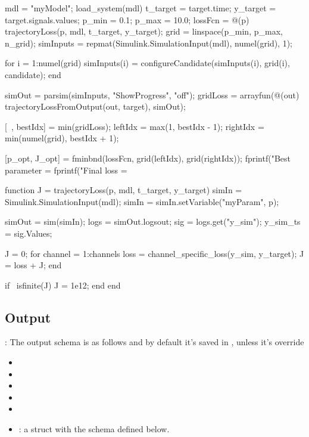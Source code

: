 \documentclass[11pt]{article}
\begin{document}
\begin{DocCode}
mdl = "myModel";
load_system(mdl)
t_target = target.time;
y_target = target.signals.values;
p_min = 0.1;
p_max = 10.0;
lossFcn = @(p) trajectoryLoss(p, mdl, t_target, y_target);
grid = linspace(p_min, p_max, n_grid);
simInputs = repmat(Simulink.SimulationInput(mdl), numel(grid), 1);

for i = 1:numel(grid)
    simInputs(i) = configureCandidate(simInputs(i), grid(i), candidate);
end

simOut = parsim(simInputs, "ShowProgress", "off");
gridLoss = arrayfun(@(out) trajectoryLossFromOutput(out, target), simOut);

[~, bestIdx] = min(gridLoss);
leftIdx = max(1, bestIdx - 1);
rightIdx = min(numel(grid), bestIdx + 1);

[p_opt, J_opt] = fminbnd(lossFcn, grid(leftIdx), grid(rightIdx));
fprintf("Best parameter = %
fprintf("Final loss = %

function J = trajectoryLoss(p, mdl, t_target, y_target)
    simIn = Simulink.SimulationInput(mdl);
    simIn = simIn.setVariable("myParam", p);

    simOut = sim(simIn);
    logs = simOut.logsout;
    sig = logs.get("y_sim");
    y_sim_ts = sig.Values;

    J = 0;
    for channel = 1:channels
        loss = channel_specific_loss(y_sim, y_target);
        J = loss + J;
    end

    if ~isfinite(J)
        J = 1e12;
    end
end

\subsection{Output}:
The output schema is as follows and by default it's saved in  , unless it's override
\begin{itemize}
    \item {}
    \item {}
    \item {}
    \item {}
    \item {}
    \item {}: a struct with the schema defined below.
\end{itemize}


\end{DocCode}
\end{document}
